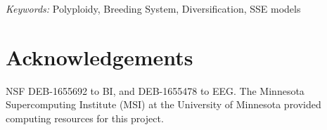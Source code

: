 \documentclass[11pt]{article}
\begin{document}
\noindent \textit{Keywords:} 
Polyploidy,
Breeding System,
Diversification, SSE models

\vfill

\linenumbers


\clearpage



\clearpage





\section{Acknowledgements}

NSF DEB-1655692 to BI, and DEB-1655478 to EEG.
The Minnesota Supercomputing Institute (MSI) at the University of Minnesota provided computing resources for this project.


\clearpage


\setstretch{\stretchby}
\end{document}
